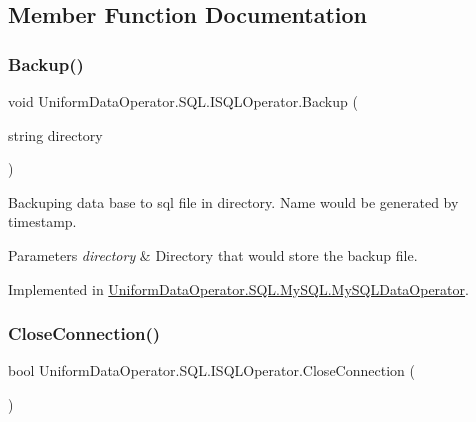 \subsection{Member Function Documentation}
\mbox{\label{interface_uniform_data_operator_1_1_s_q_l_1_1_i_s_q_l_operator_acc29fb7a4b5c3d2dc91d5f9f32b91ca5}} 
\subsubsection{\texorpdfstring{Backup()}{Backup()}}
{\footnotesize\ttfamily void Uniform\+Data\+Operator.\+S\+Q\+L.\+I\+S\+Q\+L\+Operator.\+Backup (\begin{DoxyParamCaption}\item[{string}]{directory }\end{DoxyParamCaption})}



Backuping data base to sql file in directory. Name would be generated by timestamp. 


\begin{DoxyParams}{Parameters}
{\em directory} & Directory that would store the backup file.\\
\hline
\end{DoxyParams}


Implemented in \mbox{\hyperlink{class_uniform_data_operator_1_1_s_q_l_1_1_my_s_q_l_1_1_my_s_q_l_data_operator_a3684b6d5abbcde94880ef433a8ffb28f}{Uniform\+Data\+Operator.\+S\+Q\+L.\+My\+S\+Q\+L.\+My\+S\+Q\+L\+Data\+Operator}}.

\mbox{\label{interface_uniform_data_operator_1_1_s_q_l_1_1_i_s_q_l_operator_a4d13aeb36ebbe0f08eedf48777b048a3}} 
\subsubsection{\texorpdfstring{Close\+Connection()}{CloseConnection()}}
{\footnotesize\ttfamily bool Uniform\+Data\+Operator.\+S\+Q\+L.\+I\+S\+Q\+L\+Operator.\+Close\+Connection (\begin{DoxyParamCaption}{ }\end{DoxyParamCaption})}



